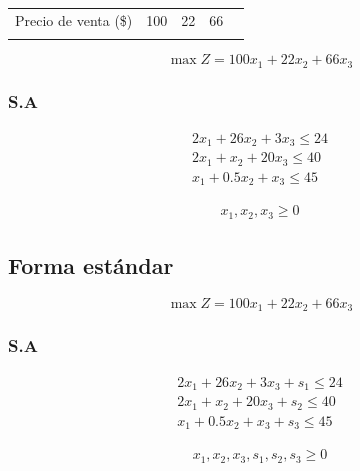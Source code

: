 \documentclass[conference]{IEEEtran}
\begin{document}
\begin{table}[H]
\begin{center}
\begin{tabularx}{\linewidth}{ccccc}
            \\

            Precio de venta (\$)                                                            & 100 & 22 & 66               \\\\\hline
        \end{tabularx}
    \end{center}
\end{table}

\begin{equation*}
    \max Z = 100x_{1} + 22x_{2} + 66x_{3}
\end{equation*}

\subsubsection*{S.A}

\begin{align*}
    2x_{1} + 26x_{2} + 3x_{3} \leq 24 \\
    2x_{1} + x_{2} + 20x_{3} \leq 40  \\
    x_{1} + 0.5x_{2} + x_{3} \leq 45
\end{align*}

\begin{align*}
    x_{1}, x_{2}, x_{3} \geq 0
\end{align*}

\subsection*{Forma estándar}

\begin{equation*}
    \max Z = 100x_{1} + 22x_{2} + 66x_{3}
\end{equation*}

\subsubsection*{S.A}

\begin{align*}
    2x_{1} + 26x_{2} + 3x_{3} + s_{1} \leq 24 \\
    2x_{1} + x_{2} + 20x_{3}  + s_{2} \leq 40 \\
    x_{1} + 0.5x_{2} + x_{3}  + s_{3} \leq 45
\end{align*}

\begin{align*}
    x_{1}, x_{2}, x_{3}, s_{1}, s_{2}, s_{3} \geq 0
\end{align*}
\end{document}
